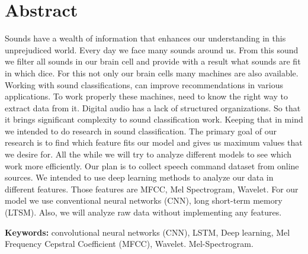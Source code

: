 \section*{Abstract}
Sounds have a wealth of information that enhances our understanding in this unprejudiced world. 
Every day we face many sounds around us. From this sound we filter all sounds in our brain cell and provide with a result what sounds are fit in which dice. 
For this not only our brain cells many machines are also available. Working with sound classifications, can improve recommendations in various applications. To work properly these machines, need to know the right way to extract data from it. Digital audio has a lack of structured organizations. So that it brings significant complexity to sound classification work. Keeping that in mind we intended to do research in sound classification. The primary goal of our research is to find which feature fits our model and gives us maximum values that we desire for. All the while we will try to analyze different models to see which work more efficiently. Our plan is to collect speech command dataset from online sources. We intended to use deep learning methods to analyze our data in different features. Those features are MFCC, Mel Spectrogram, Wavelet. For our model we use conventional neural networks (CNN), long short-term memory (LTSM). Also, we will analyze raw data without implementing any features. 




\vspace{1cm}
\textbf{Keywords:}  convolutional neural networks (CNN), LSTM, Deep learning, Mel Frequency Cepstral Coefficient (MFCC), Wavelet. Mel-Spectrogram.
\pagebreak
